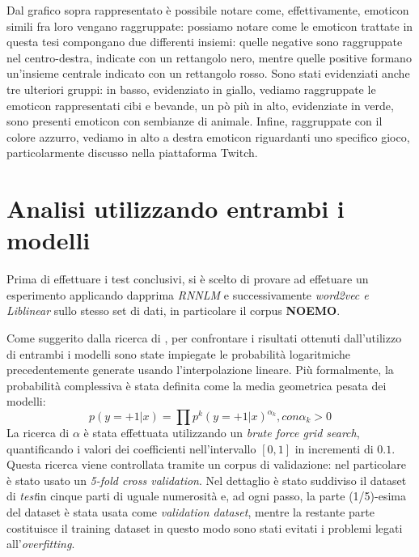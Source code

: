 \documentclass[a4paper,12pt,openright,twoside]{report}
\theoremstyle{definition}
\begin{document}
Dal grafico sopra rappresentato è possibile notare come, effettivamente, emoticon simili fra loro vengano raggruppate:
possiamo notare come le emoticon trattate in questa tesi compongano due differenti insiemi: quelle negative sono raggruppate nel centro-destra, indicate con un rettangolo nero, mentre quelle positive formano un'insieme centrale indicato con un rettangolo rosso.
Sono stati evidenziati anche tre ulteriori gruppi: in basso, evidenziato in giallo, vediamo raggruppate le emoticon rappresentati cibi e bevande,
un pò più in alto, evidenziate in verde, sono presenti emoticon con sembianze di animale. Infine, raggruppate con il colore azzurro, vediamo in alto a destra emoticon riguardanti uno specifico gioco, particolarmente discusso nella piattaforma Twitch.

\section{Analisi utilizzando entrambi i modelli}
Prima di effettuare i test conclusivi, si è scelto di provare ad effetuare un esperimento  applicando
 dapprima \emph{RNNLM} e successivamente \emph{word2vec e Liblinear} sullo stesso set di dati, 
in particolare il corpus \textbf{NOEMO}.

Come suggerito dalla ricerca di \cite{Mik2014}, per confrontare i risultati ottenuti dall'utilizzo di entrambi i modelli
sono state impiegate le probabilità logaritmiche precedentemente generate usando l'interpolazione lineare.
Più formalmente, la probabilità complessiva  è stata definita come la media geometrica pesata
dei modelli:
\begin{equation}
	p(y=+1|x)=\prod p^k(y=+1|x)^{\alpha_k}, con \alpha_k > 0
	\label{eq:media}
\end{equation}
La ricerca di $\alpha$ è stata effettuata utilizzando un \emph{brute force grid search}, 
quantificando
i valori dei coefficienti nell'intervallo $[0,1]$ in incrementi di $0.1$.
Questa ricerca viene controllata tramite un corpus di validazione: nel particolare
è stato usato un \emph{5-fold cross validation}.
Nel dettaglio è stato suddiviso il dataset di \emph{test}in cinque parti di uguale numerosità e, ad ogni passo, la parte (1/5)-esima del dataset 
è stata usata come \emph{validation dataset}, mentre la restante parte costituisce il training dataset
in questo modo sono stati evitati i problemi legati all'\emph{overfitting}.
\end{document}
